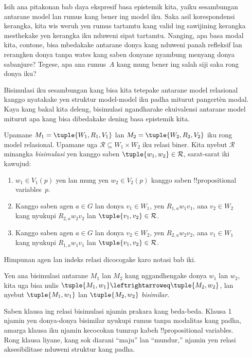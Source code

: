 \documentclass[../../../include/open-logic-section]{subfiles}
\begin{document}


Isih ana pitakonan bab daya ekspresif basa epistemik kita, yaiku
sesambungan antarane model lan rumus kang bener ing model iku.
Saka asil korespondensi kerangka, kita wis weruh yen rumus tartamtu
kang valid ing sawijining kerangka mesthekake yen kerangka iku nduweni
sipat tartamtu. Nanging, apa basa modal kita, contone, bisa mbedakake
antarane donya kang nduweni panah refleksif lan rerangken donya tanpa
wates kang saben donyane nyambung menyang donya sabanjure? Tegese,
apa ana rumus~$A$ kang mung bener ing salah siji saka rong donya iku?

Bisimulasi iku sesambungan kang bisa kita tetepake antarane model
relasional kanggo nyatakake yen struktur model-model iku padha
miturut pangertèn modal. Kaya kang bakal kita deleng, bisimulasi
ngandharake ekuivalensi antarane model miturut apa kang bisa
dibedakake dening basa epistemik kita.

\begin{defn}[Bisimulasi]
Upamane $M_1 = \tuple{W_1, R_1, V_1}$ lan $M_2 = \tuple{W_2, R_2, V_2}$
iku rong model relasional. Upamane uga $\mathcal{R} \subseteq W_1 \times W_2$
iku relasi biner. Kita nyebut $\mathcal{R}$ minangka
\emph{bisimulasi} yen kanggo saben $\tuple{w_1, w_2} \in \mathcal{R}$,
sarat-sarat iki kawujud:

\begin{enumerate}
  \item $w_1 \in V_1(p)$ yen lan mung yen $w_2 \in V_2(p)$ kanggo saben
  !!{propositional variable}s~$p$.
  \item Kanggo saben agen $a \in G$ lan donya $v_1 \in W_1$, yen
  $R_{1,a} w_1 v_1$, ana $v_2 \in W_2$ kang nyukupi
  $R_{2,a} w_2 v_2$ lan $\tuple{v_1, v_2} \in
  \mathcal{R}$.
  \item Kanggo saben agen $a \in G$ lan donya $v_2 \in W_2$, yen
   $R_{2,a} w_2 v_2$, ana $v_1 \in W_1$ kang nyukupi
   $R_{1,a} w_1 v_1$ lan $\tuple{v_1, v_2} \in
   \mathcal{R}$.
\end{enumerate}
Himpunan agen lan indeks relasi dicocogake karo notasi bab iki.

Yen ana bisimulasi antarane $M_1$ lan $M_2$ kang nggandhengake donya
$w_1$ lan $w_2$, kita uga bisa nulis $\tuple{M_1, w_1} \leftrightarroweq
\tuple{M_2, w_2}$, lan nyebut $\tuple{M_1, w_1}$ lan $\tuple{M_2, w_2}$
\emph{bisimilar}.
\end{defn}

Saben klausa ing relasi bisimulasi njamin prakara kang beda-beda.
Klausa 1 njamin yen donya-donya bisimilar nyukupi rumus tanpa
modalitas kang padha, amarga klausa iku njamin kecocokan tumrap kabeh
!!{propositional variable}s. Rong klausa liyane, kang sok diarani
``maju'' lan ``mundur,'' njamin yen relasi aksesibilitase nduweni
struktur kang padha.
\end{document}
